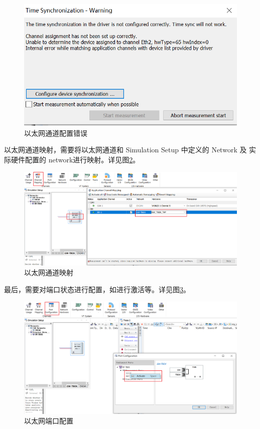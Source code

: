 \begin{figure}[!ht]
    \centering
    \includegraphics[scale=1]{pic/Snipaste_2021-10-29_15-22-58.png}
    \caption{以太网通道配置错误}
    \label{fig:eth_channel_usage_error}
\end{figure}

以太网通道映射，需要将以太网通道和 Simulation Setup 中定义的 Network 及 实际硬件配置的 network进行映射。详见图\ref{fig:eth_channel_mapping}。
\begin{figure}[!ht]
    \centering
    \includegraphics[scale=0.5]{pic/Snipaste_2021-10-29_15-25-55.png}
    \caption{以太网通道映射}
    \label{fig:eth_channel_mapping}
\end{figure}

最后，需要对端口状态进行配置，如进行激活等。详见图\ref{fig:port_Configuration}。
\begin{figure}[!ht]
    \centering
    \includegraphics[scale=0.5]{pic/Snipaste_2021-10-29_15-29-21.png}
    \caption{以太网端口配置}
    \label{fig:port_Configuration}
\end{figure}

